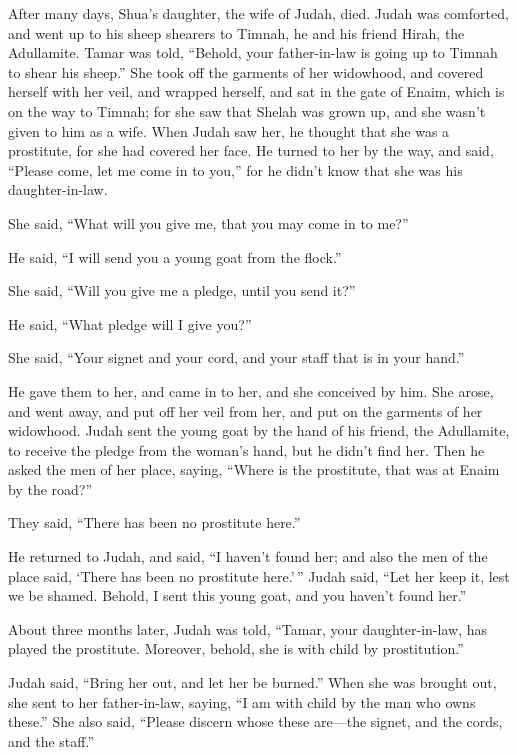  After many days, Shua's daughter, the wife of Judah,
died. Judah was comforted, and went up to his sheep shearers to Timnah,
he and his friend Hirah, the Adullamite.  Tamar was told,
``Behold, your father-in-law is going up to Timnah to shear his sheep.''
 She took off the garments of her widowhood, and covered
herself with her veil, and wrapped herself, and sat in the gate of
Enaim, which is on the way to Timnah; for she saw that Shelah was grown
up, and she wasn't given to him as a wife.  When Judah
saw her, he thought that she was a prostitute, for she had covered her
face.  He turned to her by the way, and said, ``Please
come, let me come in to you,'' for he didn't know that she was his
daughter-in-law.

She said, ``What will you give me, that you may come in to me?''

 He said, ``I will send you a young goat from the
flock.''

She said, ``Will you give me a pledge, until you send it?''

 He said, ``What pledge will I give you?''

She said, ``Your signet and your cord, and your staff that is in your
hand.''

He gave them to her, and came in to her, and she conceived by him.
 She arose, and went away, and put off her veil from her,
and put on the garments of her widowhood.  Judah sent the
young goat by the hand of his friend, the Adullamite, to receive the
pledge from the woman's hand, but he didn't find her. 
Then he asked the men of her place, saying, ``Where is the prostitute,
that was at Enaim by the road?''

They said, ``There has been no prostitute here.''

 He returned to Judah, and said, ``I haven't found her;
and also the men of the place said, `There has been no prostitute
here.'\,''  Judah said, ``Let her keep it, lest we be
shamed. Behold, I sent this young goat, and you haven't found her.''

 About three months later, Judah was told, ``Tamar, your
daughter-in-law, has played the prostitute. Moreover, behold, she is
with child by prostitution.''

Judah said, ``Bring her out, and let her be burned.'' 
When she was brought out, she sent to her father-in-law, saying, ``I am
with child by the man who owns these.'' She also said, ``Please discern
whose these are---the signet, and the cords, and the staff.''

